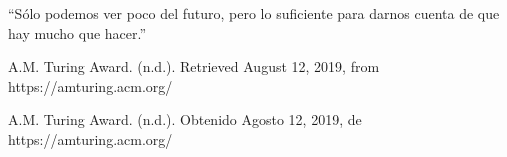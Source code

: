\documentclass[notitlepage,letterpaper, 11pt]{article}
\begin{document}
``Sólo podemos ver poco del futuro, pero lo suficiente para darnos cuenta de que hay mucho que hacer.''


A.M. Turing Award. (n.d.). Retrieved August 12, 2019, from https://amturing.acm.org/

\begin{thebibliography}{*}
     A.M. Turing Award. (n.d.). Obtenido Agosto 12, 2019, de https://amturing.acm.org/
    \end{thebibliography}
\end{document}
